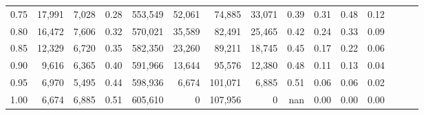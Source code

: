 \begin{tabular}{rrrrrrrrrrrrrrr}
0.75 &  17,991 &  7,028 &  0.28 &  553,549 &   52,061 &   74,885 &   33,071 &  0.39 &  0.31 &  0.48 &      0.12 \\
0.80 &  16,472 &  7,606 &  0.32 &  570,021 &   35,589 &   82,491 &   25,465 &  0.42 &  0.24 &  0.33 &      0.09 \\
0.85 &  12,329 &  6,720 &  0.35 &  582,350 &   23,260 &   89,211 &   18,745 &  0.45 &  0.17 &  0.22 &      0.06 \\
0.90 &   9,616 &  6,365 &  0.40 &  591,966 &   13,644 &   95,576 &   12,380 &  0.48 &  0.11 &  0.13 &      0.04 \\
0.95 &   6,970 &  5,495 &  0.44 &  598,936 &    6,674 &  101,071 &    6,885 &  0.51 &  0.06 &  0.06 &      0.02 \\
1.00 &   6,674 &  6,885 &  0.51 &  605,610 &        0 &  107,956 &        0 &   nan &  0.00 &  0.00 &      0.00 \\
\bottomrule
\end{tabular}
